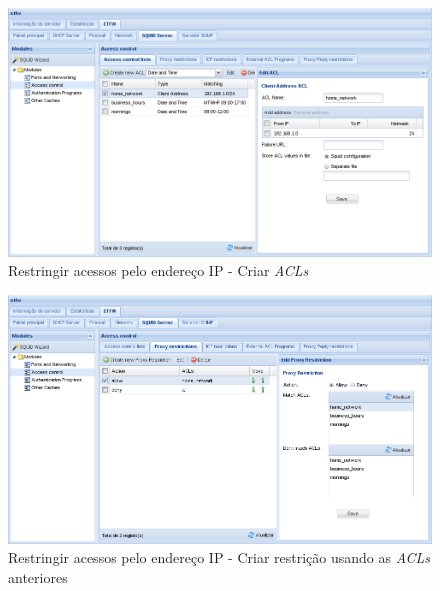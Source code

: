 \begin{figure}[H]
    \begin{center}
    \includegraphics[scale=0.38]{screenshots/etfw/etfw_squid_example_acessoip_01.png}
    \caption{Restringir acessos pelo endereço IP - Criar \textit{ACLs}}
    \label{fig:etfw_squid_example_acessoip_01}
    \end{center}
\end{figure}

\begin{figure}[H]
    \begin{center}
    \includegraphics[scale=0.38]{screenshots/etfw/etfw_squid_example_acessoip_02.png}
    \caption{Restringir acessos pelo endereço IP - Criar restrição usando as \textit{ACLs} anteriores}
    \label{fig:etfw_squid_example_acessoip_02}
    \end{center}
\end{figure}

